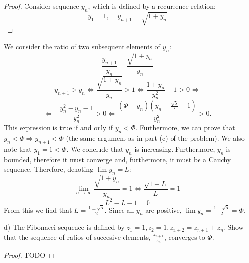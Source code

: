\documentclass{article}
\begin{document}
\begin{proof}
Consider sequence $y_n$, which is defined by a recurrence relation:
$$ y_1 = 1, \>\>\>\>\> y_{n+1} = \sqrt{1 + y_n} $$
\end{proof}

We consider the ratio of two subsequent elements of $y_n$:
$$ \frac{y_{n+1}}{y_n} = \frac{\sqrt{1+y_n}}{y_n} $$
$$ y_{n+1} > y_n \iff \frac{\sqrt{1+y_n}}{y_n} > 1 \iff \frac{1+y_n}{y_n^2} -1 > 0 \iff $$
$$ \iff -\frac{y_n^2-y_n-1}{y_n^2} > 0 \iff \frac{(\Phi-y_n)(y_n+\frac{\sqrt{5}}{2}-1)}{y_n^2} > 0. $$
This expression is true if and only if $y_n < \Phi$. Furthermore, we can prove that $y_n < \Phi \Rightarrow y_{n+1} < \Phi$ (the same argument as in part (c) of the problem). We also note that $y_1 = 1 < \Phi$. We conclude that $y_n$ is increasing. Furthermore, $y_n$ is bounded, therefore it must converge and, furthermore, it must be a Cauchy sequence. Therefore, denoting $\lim y_n = L$:
$$ \lim_{n \to \infty} \frac{\sqrt{1+y_n}}{y_n} = 1 \iff \frac{\sqrt{1+L}}{L} = 1 $$
$$ L^2 - L - 1 = 0 $$
From this we find that $L = \frac{1 \pm \sqrt{5}}{2}$. Since all $y_n$ are positive, $\lim y_n = \frac{1+\sqrt{5}}{2} = \Phi$.


\begin{tcolorbox}
d) The Fibonacci sequence is defined by $z_1 = 1, z_2 = 1, z_{n+2} = z_{n+1} + z_n$. Show that the
sequence of ratios of succesive elements, $\frac{z_{n+1}}{z_n}$, converges to $\Phi$.
\end{tcolorbox}
\begin{proof}
TODO
\end{proof}
\end{document}
